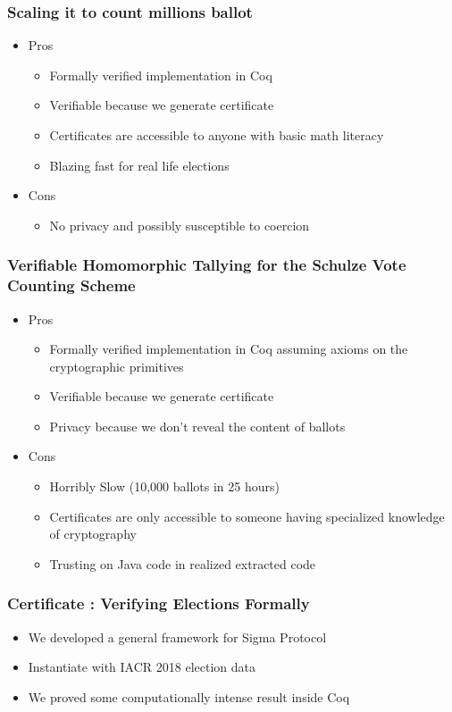 \documentclass{beamer}
\begin{document}
\begin{frame}
\frametitle{Scaling it to count millions ballot }
\begin{itemize}[]
\item Pros 
\begin{itemize}
\item Formally verified implementation in Coq
\item Verifiable because we generate certificate
\item Certificates are accessible to anyone with 
      basic math literacy
\item Blazing fast for real life elections
\end{itemize}
\item Cons
\begin{itemize}
\item No privacy and possibly susceptible to coercion
\end{itemize}
\end{itemize}
\end{frame}



\begin{frame}
\frametitle{Verifiable Homomorphic Tallying for the Schulze Vote Counting Scheme}
\begin{itemize}[]
\item Pros 
\begin{itemize}
\item Formally verified implementation in Coq assuming axioms on 
          the cryptographic primitives 
\item Verifiable because we generate certificate 
\item Privacy because we don't reveal the content of ballots
\end{itemize}
\item Cons
\begin{itemize}
\item Horribly Slow (10,000 ballots in 25 hours)
\item Certificates are only accessible to someone having specialized 
	  knowledge of cryptography
\item Trusting on Java code in realized extracted code
\end{itemize}
\end{itemize}
\end{frame}


\begin{frame}
\frametitle{Certificate : Verifying Elections Formally}
\begin{itemize}
\item We developed a general framework for Sigma Protocol
\item Instantiate with IACR 2018 election data
\item We proved some computationally intense result inside 
      Coq
\end{itemize}
\end{frame}
\end{document}
